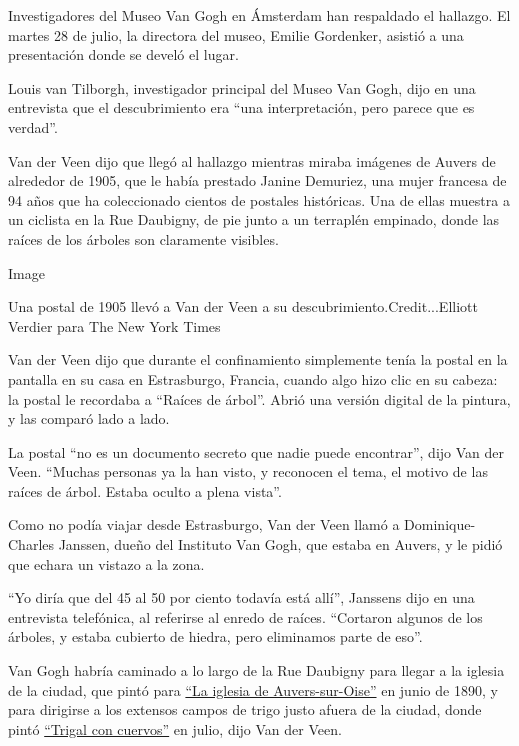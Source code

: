 Investigadores del Museo Van Gogh en Ámsterdam han respaldado el
hallazgo. El martes 28 de julio, la directora del museo, Emilie
Gordenker, asistió a una presentación donde se develó el lugar.

Louis van Tilborgh, investigador principal del Museo Van Gogh, dijo en
una entrevista que el descubrimiento era ``una interpretación, pero
parece que es verdad''.

Van der Veen dijo que llegó al hallazgo mientras miraba imágenes de
Auvers de alrededor de 1905, que le había prestado Janine Demuriez, una
mujer francesa de 94 años que ha coleccionado cientos de postales
históricas. Una de ellas muestra a un ciclista en la Rue Daubigny, de
pie junto a un terraplén empinado, donde las raíces de los árboles son
claramente visibles.

Image

Una postal de 1905 llevó a Van der Veen a su
descubrimiento.Credit...Elliott Verdier para The New York Times

Van der Veen dijo que durante el confinamiento simplemente tenía la
postal en la pantalla en su casa en Estrasburgo, Francia, cuando algo
hizo clic en su cabeza: la postal le recordaba a ``Raíces de árbol''.
Abrió una versión digital de la pintura, y las comparó lado a lado.

La postal ``no es un documento secreto que nadie puede encontrar'', dijo
Van der Veen. ``Muchas personas ya la han visto, y reconocen el tema, el
motivo de las raíces de árbol. Estaba oculto a plena vista''.

Como no podía viajar desde Estrasburgo, Van der Veen llamó a
Dominique-Charles Janssen, dueño del Instituto Van Gogh, que estaba en
Auvers, y le pidió que echara un vistazo a la zona.

``Yo diría que del 45 al 50 por ciento todavía está allí'', Janssens
dijo en una entrevista telefónica, al referirse al enredo de raíces.
``Cortaron algunos de los árboles, y estaba cubierto de hiedra, pero
eliminamos parte de eso''.

Van Gogh habría caminado a lo largo de la Rue Daubigny para llegar a la
iglesia de la ciudad, que pintó para
\href{https://www.musee-orsay.fr/en/collections/works-in-focus/painting/commentaire_id/the-church-in-auvers-sur-oise-7170.html?cHash=6d6ea9b5c1}{``La
iglesia de Auvers-sur-Oise''} en junio de 1890, y para dirigirse a los
extensos campos de trigo justo afuera de la ciudad, donde pintó
\href{https://www.vangoghmuseum.nl/en/collection/s0149V1962}{``Trigal
con cuervos''} en julio, dijo Van der Veen.

